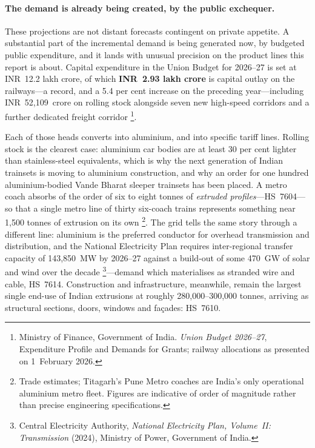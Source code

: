 \documentclass[11pt, a4paper]{article}
\numberwithin{figure}{section}
\numberwithin{table}{section}
\begin{document}
\paragraph{The demand is already being created, by the public exchequer.} These
projections are not distant forecasts contingent on private appetite. A substantial
part of the incremental demand is being generated now, by budgeted public
expenditure, and it lands with unusual precision on the product lines this report is
about. Capital expenditure in the Union Budget for 2026--27 is set at INR~12.2 lakh
crore, of which \textbf{INR~2.93 lakh crore} is capital outlay on the railways---a
record, and a 5.4 per cent increase on the preceding year---including
INR~52,109~crore on rolling stock alongside seven new high-speed corridors and a
further dedicated freight corridor \cite{budget2027}\footnote{Ministry of Finance,
Government of India. \textit{Union Budget 2026--27}, Expenditure Profile and Demands
for Grants; railway allocations as presented on 1~February 2026.}.

Each of those heads converts into aluminium, and into specific tariff lines. Rolling
stock is the clearest case: aluminium car bodies are at least 30 per cent lighter
than stainless-steel equivalents, which is why the next generation of Indian trainsets
is moving to aluminium construction, and why an order for one hundred aluminium-bodied
Vande Bharat sleeper trainsets has been placed. A metro coach absorbs of the order of
six to eight tonnes of \emph{extruded profiles}---HS~7604---so that a single metro line
of thirty six-coach trains represents something near 1,500 tonnes of extrusion on its
own \cite{railal2026}\footnote{Trade estimates; Titagarh's Pune Metro coaches are
India's only operational aluminium metro fleet. Figures are indicative of order of
magnitude rather than precise engineering specifications.}. The grid tells the same
story through a different line: aluminium is the preferred conductor for overhead
transmission and distribution, and the National Electricity Plan requires inter-regional
transfer capacity of 143,850~MW by 2026--27 against a build-out of some 470~GW of solar
and wind over the decade \cite{cea2024}\footnote{Central Electricity Authority,
\textit{National Electricity Plan, Volume~II: Transmission} (2024), Ministry of Power,
Government of India.}---demand which materialises as stranded wire and cable, HS~7614.
Construction and infrastructure, meanwhile, remain the largest single end-use of Indian
extrusions at roughly 280,000--300,000 tonnes, arriving as structural sections, doors,
windows and fa\c{c}ades: HS~7610.
\end{document}
